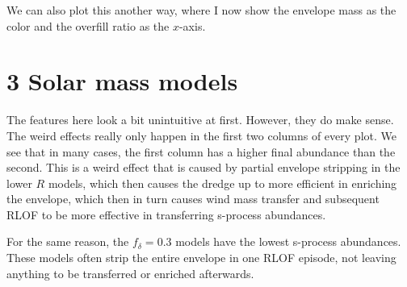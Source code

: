 \documentclass[a4paper,10pt]{article}
\begin{document}
\begin{figure}[ht]
	\centering
\end{figure}

We can also plot this another way, where I now show the envelope mass as the color and the
overfill ratio as the \(x\)-axis.
\begin{figure}[ht]
	\centering
\end{figure}

\begin{figure}[ht]
	\centering
\end{figure}

\begin{figure}[ht]
	\centering
\end{figure}

\begin{figure}[ht]
	\centering
\end{figure}

\nextpage
\section{3 Solar mass models}

\begin{figure}[ht]
	\centering
\end{figure}

The features here look a bit unintuitive at first.
However, they do make sense.
The weird effects really only happen in the first two columns of every plot.
We see that in many cases, the first column
has a higher final abundance than the second.
This is a weird effect that is caused by partial envelope stripping
in the lower \(R\) models, which then causes the dredge up to more efficient in enriching the envelope, which then
in turn causes wind mass transfer and subsequent RLOF to be more effective in transferring s-process abundances.

For the same reason, the \(f_\delta =0.3\) models have the lowest s-process abundances.
These models often
strip the entire envelope in one RLOF episode, not leaving anything to be transferred or enriched afterwards.

\begin{figure}[ht]
	\centering
\end{figure}

\begin{figure}[ht]
	\centering
\end{figure}
\end{document}
